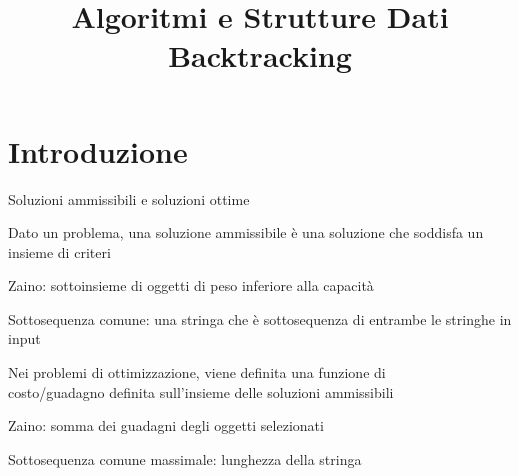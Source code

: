 
\title[ASD - Backtracking]{\textbf{Algoritmi e Strutture Dati}\\[24pt]Backtracking}

\usepackage[mode=buildnew]{standalone}
\usepackage{xcolor}
\usepackage{colortbl}
\usepackage{epigraph}
\usepackage{tikz}
\usepackage{xmpmulti}
\usepackage{listings}

\newcommand{\R}[1]{\textcolor{red}{#1}}
\newcommand{\B}[1]{\textcolor{blue}{#1}}

\renewcommand{\arraystretch}{1.4}
\graphicspath{{figs/16/}}

\renewcommand{\enumerazione}{\fontproc{enumeration}}
\newcommand{\isAdmissible}{\fontproc{accept}}
\newcommand{\isImpossible}{\fontproc{reject}}




\FrameTitle{}

\FrameContent



\section{Introduzione}

\begin{frame}{Soluzioni ammissibili e soluzioni ottime}

\vspace{-9pt}
\begin{myboxtitle}
Dato un problema, una \alert{soluzione ammissibile} è una soluzione che \alert{soddisfa un insieme di criteri}
\BIL
\item \alert{Zaino}: sottoinsieme di oggetti di peso inferiore alla capacità
\item \alert{Sottosequenza} comune: una stringa che è sottosequenza di entrambe le stringhe in input
\EIL
\end{myboxtitle}

 
\begin{myboxtitle}
Nei problemi di ottimizzazione, viene definita una \alert{funzione di\\ costo/guadagno} definita sull'insieme delle soluzioni ammissibili
\BIL
\item \alert{Zaino}: somma dei guadagni degli oggetti selezionati
\item \alert{Sottosequenza comune massimale}: lunghezza della stringa
\EIL
\end{myboxtitle}

\end{frame}

